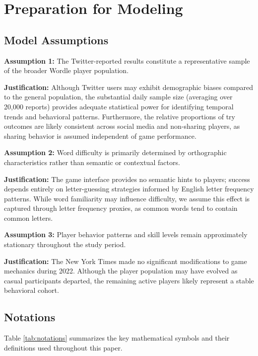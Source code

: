 \documentclass{mcmthesis}
\begin{document}
\section{Preparation for Modeling}

\subsection{Model Assumptions}

\textbf{Assumption 1:} The Twitter-reported results constitute a representative sample of the broader Wordle player population.

\textbf{Justification:} Although Twitter users may exhibit demographic biases compared to the general population, the substantial daily sample size (averaging over 20,000 reports) provides adequate statistical power for identifying temporal trends and behavioral patterns. Furthermore, the relative proportions of try outcomes are likely consistent across social media and non-sharing players, as sharing behavior is assumed independent of game performance.

\textbf{Assumption 2:} Word difficulty is primarily determined by orthographic characteristics rather than semantic or contextual factors.

\textbf{Justification:} The game interface provides no semantic hints to players; success depends entirely on letter-guessing strategies informed by English letter frequency patterns. While word familiarity may influence difficulty, we assume this effect is captured through letter frequency proxies, as common words tend to contain common letters.

\textbf{Assumption 3:} Player behavior patterns and skill levels remain approximately stationary throughout the study period.

\textbf{Justification:} The New York Times made no significant modifications to game mechanics during 2022. Although the player population may have evolved as casual participants departed, the remaining active players likely represent a stable behavioral cohort.

\subsection{Notations}

Table \ref{tab:notations} summarizes the key mathematical symbols and their definitions used throughout this paper.
\end{document}
